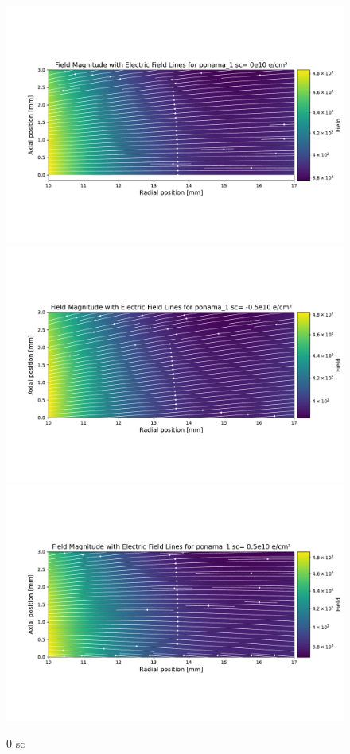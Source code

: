 \clearpage
\begin{figure}[!htb]
\centering
\includegraphics[trim={1cm 3.5cm 0.5cm 4.0cm},clip,width=0.99\linewidth]{ch3/figs/elect_field_lines_surface_ponama_1_sc_0.pdf}
\includegraphics[trim={1cm 3.5cm 0.5cm 4.0cm},clip,width=0.99\linewidth]{ch3/figs/elect_field_lines_surface_ponama_1_sc_-0.5.pdf}
\includegraphics[trim={1cm 3.5cm 0.5cm 4.0cm},clip,width=0.99\linewidth]{ch3/figs/elect_field_lines_surface_ponama_1_sc_0.5.pdf}

 \caption{0 sc}
\label{ch3:fig:surface_field_sc0}
  \end{figure}

